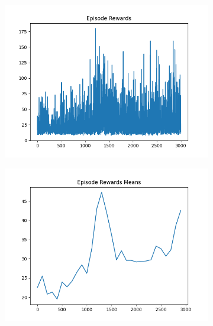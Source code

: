 \begin{figure}[H]
    \centering
    \begin{subfigure}{.47\linewidth}
        \centering
        \includegraphics[width=\textwidth]{pole/2024-06-13_19-16-11_dqn_cartpole_episode_rewards.png}
    \end{subfigure}
    \begin{subfigure}{.47\linewidth}
        \centering
        \includegraphics[width=\textwidth]{pole/2024-06-13_19-16-11_dqn_cartpole_episode_rewards_means.png}
    \end{subfigure}
    \begin{subfigure}{.47\linewidth}
        \centering

\end{subfigure}
\end{figure}
